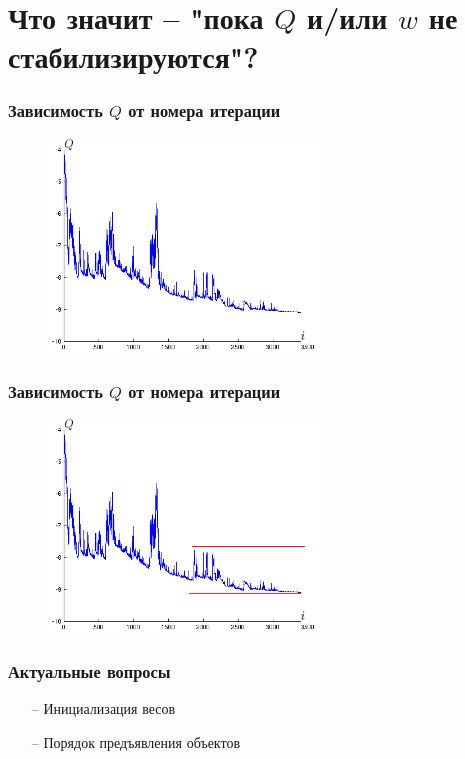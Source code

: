 \documentclass[10pt]{beamer}
\begin{document}
\section{Что значит -- "пока $Q$ и/или $w$ не стабилизируются"?}

\begin{frame}\frametitle{Зависимость $Q$ от номера итерации}
	\begin{figure}[htbp]
	  \includegraphics[height=160pt, keepaspectratio = true]{images/stochastic_gradient}
	\end{figure}
\end{frame}

\begin{frame}\frametitle{Зависимость $Q$ от номера итерации}
	\begin{figure}[htbp]
	  \includegraphics[height=160pt, keepaspectratio = true]{images/stochastic_gradient1}
	\end{figure}
\end{frame}

\begin{frame}\frametitle{Актуальные вопросы}
	\begin{itemize} [<+->]
		\item[--] Инициализация весов
		\item[--] Порядок предъявления объектов
	\end{itemize}
\end{frame}
\end{document}
